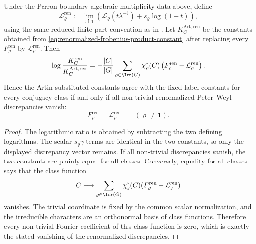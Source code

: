 \begin{remark}
  \label{thm:renormalized-artin-obstruction}
  Under the Perron-boundary algebraic multiplicity data above, define
  \[
    \mathcal L_\varrho^{\mathrm{ren}}
    :=
    \lim_{t\uparrow1}
      \left(\mathcal L_\varrho(t\lambda^{-1})
      +s_\varrho\log(1-t)\right),
  \]
  using the same reduced finite-part convention as in
  .  Let
  \(K_C^{\mathrm{Art,ren}}\) be the constants obtained from
  \eqref{eq:renormalized-frobenius-product-constant} after replacing
  every \(F_\varrho^{\mathrm{ren}}\) by
  \(\mathcal L_\varrho^{\mathrm{ren}}\).  Then
  \[
    \log\frac{K_C^{\mathrm{ren}}}{K_C^{\mathrm{Art,ren}}}
    =
    -\frac{|C|}{|G|}
      \sum_{\varrho\in\Irr(G)}
        \chi_\varrho^\ast(C)
        \left(F_\varrho^{\mathrm{ren}}
        -\mathcal L_\varrho^{\mathrm{ren}}\right).
  \]
  Hence the Artin-substituted constants agree with the fixed-label
  constants for every conjugacy class if and only if all non-trivial
  renormalized Peter--Weyl discrepancies vanish:
  \[
    F_\varrho^{\mathrm{ren}}
    =
    \mathcal L_\varrho^{\mathrm{ren}}
    \qquad(\varrho\ne\mathbf1).
  \]
\end{remark}

\begin{proof}
  The logarithmic ratio is obtained by subtracting the two defining
  logarithms.  The scalar \(s_\varrho\gamma\) terms are identical in the two
  constants, so only the displayed discrepancy vector remains.  If all
  non-trivial discrepancies vanish, the two constants are plainly equal for
  all classes.  Conversely, equality for all classes says that the class
  function
  \[
    C\longmapsto
    \sum_{\varrho\in\Irr(G)}
      \chi_\varrho^\ast(C)
      (F_\varrho^{\mathrm{ren}}
      -\mathcal L_\varrho^{\mathrm{ren}})
  \]
  vanishes.  The trivial coordinate is fixed by the common scalar
  normalization, and the irreducible characters are an orthonormal basis of
  class functions.  Therefore every non-trivial Fourier coefficient of this
  class function is zero, which is exactly the stated vanishing of the
  renormalized discrepancies.
\end{proof}
